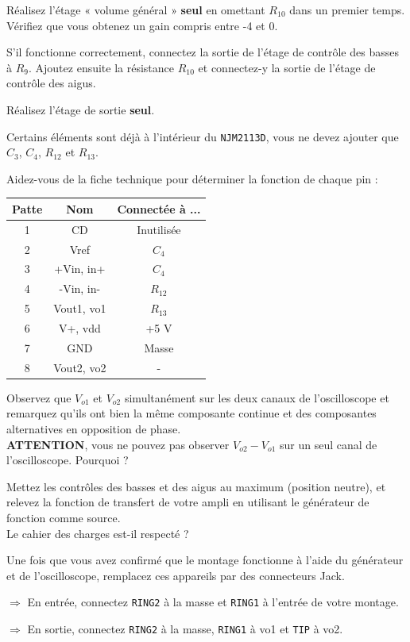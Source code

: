 \documentclass{../template/labo}
\begin{document}
\Question
{
	Réalisez l'étage « volume général » \textbf{seul} en omettant $R_{10}$ dans un premier temps. Vérifiez que vous obtenez un gain compris entre -4 et 0.

	S'il fonctionne correctement, connectez la sortie de l'étage de contrôle des basses à $R_9$. Ajoutez ensuite la résistance $R_{10}$ et connectez-y la sortie de l'étage de contrôle des aigus.
}
{}

\Question
{
	Réalisez l'étage de sortie \textbf{seul}.
	\begin{astuce}
		Certains éléments sont déjà à l'intérieur du \texttt{NJM2113D}, vous ne devez ajouter que $C_3$, $C_4$, $R_{12}$ et $R_{13}$.
	\end{astuce}

	\begin{astuce}
		Aidez-vous de la fiche technique pour déterminer la fonction de chaque pin :
		\begin{center}
			\begin{tabular}{ccc}
				Patte & Nom & Connectée à ... \\\toprule
				1 & CD & Inutilisée \\
				2 & Vref & $C_4$ \\
				3 & +Vin, in+ & $C_4$ \\
				4 & -Vin, in- & $R_{12}$ \\
				5 & Vout1, vo1 & $R_{13}$ \\
				6 & V+, vdd & +5 V \\
				7 & GND & Masse \\
				8 & Vout2, vo2 & - \\\bottomrule
			\end{tabular}
		\end{center}
	\end{astuce}

	Observez que $V_{o1}$ et $V_{o2}$ simultanément sur les deux canaux de l'oscilloscope et remarquez qu'ils ont bien la même composante continue et des composantes alternatives en opposition de phase.\\
	\textbf{ATTENTION}, vous ne pouvez pas observer $V_{o2} - V_{o1}$ sur un seul canal de l'oscilloscope. Pourquoi ?
}
{}

\Question
{
Mettez les contrôles des basses et des aigus au maximum (position neutre), et relevez la fonction de transfert de votre ampli en utilisant le générateur de fonction comme source.\\
Le cahier des charges est-il respecté ?
}
{}

\Question
{
	Une fois que vous avez confirmé que le montage fonctionne à l'aide du générateur et de l'oscilloscope, remplacez ces appareils par des connecteurs Jack.

	$\Rightarrow$ En entrée, connectez \texttt{RING2} à la masse et \texttt{RING1} à l'entrée de votre montage.

	$\Rightarrow$ En sortie, connectez \texttt{RING2} à la masse, \texttt{RING1} à vo1 et \texttt{TIP} à vo2.
}
{}
\end{document}
